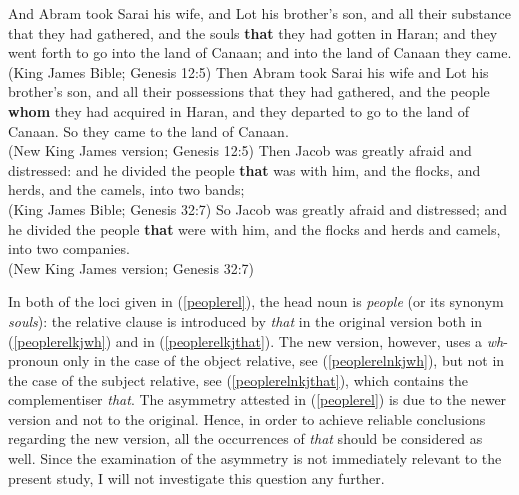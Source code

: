 \ea \label{peoplerel}
\ea And Abram took Sarai his wife, and Lot his brother's son, and all their substance that they had gathered, and the souls \textbf{that} they had gotten in Haran; and they went forth to go into the land of Canaan; and into the land of Canaan they came. \label{peoplerelkjwh}\\
(King James Bible; Genesis 12:5)
\ex Then Abram took Sarai his wife and Lot his brother's son, and all their possessions that they had gathered, and the people \textbf{whom} they had acquired in Haran, and they departed to go to the land of Canaan. So they came to the land of Canaan. \label{peoplerelnkjwh}\\
(New King James version; Genesis 12:5)
\ex Then Jacob was greatly afraid and distressed: and he divided the people \textbf{that} was with him, and the flocks, and herds, and the camels, into two bands; \label{peoplerelkjthat}\\
(King James Bible; Genesis 32:7)
\ex So Jacob was greatly afraid and distressed; and he divided the people \textbf{that} were with him, and the flocks and herds and camels, into two companies.\\
(New King James version; Genesis 32:7) \label{peoplerelnkjthat}
\z
\z

In both of the loci given in (\ref{peoplerel}), the head noun is \textit{people} (or its synonym \textit{souls}): the relative clause is introduced by \textit{that} in the original version both in (\ref{peoplerelkjwh}) and in (\ref{peoplerelkjthat}). The new version, however, uses a \textit{wh}-pronoun only in the case of the object relative, see (\ref{peoplerelnkjwh}), but not in the case of the subject relative, see (\ref{peoplerelnkjthat}), which contains the complementiser \textit{that}. The asymmetry attested in (\ref{peoplerel}) is due to the newer version and not to the original. Hence, in order to achieve reliable conclusions regarding the new version, all the occurrences of \textit{that} should be considered as well. Since the examination of the asymmetry is not immediately relevant to the present study, I will not investigate this question any further.

